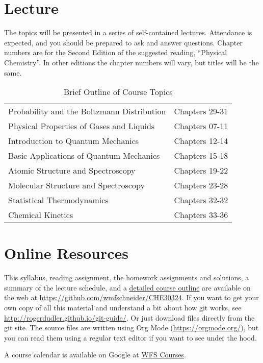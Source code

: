 \documentclass[11pt]{article}
\begin{document}
\section{Lecture}
\label{sec:org9fd3a7a}
The topics will be presented in a series of self-contained lectures. Attendance is expected, and you should be prepared to ask and answer questions. Chapter numbers are for the Second Edition of the suggested reading, ``Physical Chemistry''. In other editions the chapter numbers will vary, but titles will be the same. 

\begin{table}[htbp]
\caption{Brief Outline of Course Topics}
\centering
\begin{tabular}{ll}
\hline
Probability and the Boltzmann Distribution & Chapters 29-31\\
Physical Properties of Gases and Liquids & Chapters 07-11\\
Introduction to Quantum Mechanics & Chapters 12-14\\
Basic Applications of Quantum Mechanics & Chapters 15-18\\
Atomic Structure and Spectroscopy & Chapters 19-22\\
Molecular Structure and Spectroscopy & Chapters 23-28\\
Statistical Thermodynamics & Chapters 32-32\\
Chemical Kinetics & Chapters 33-36\\
\hline
\end{tabular}
\end{table}
\section{Online Resources}
\label{sec:org9281538}
This syllabus, reading assignment, the homework assignments and solutions, a summary of the lecture schedule, and a \href{https://github.com/wmfschneider/CHE30324/tree/master/Outline/CHE30324-outline.pdf}{detailed course outline} are available on the web at \url{https://github.com/wmfschneider/CHE30324}.  If you want to get your own copy of all this material and understand a bit about how git works, see \url{http://rogerdudler.github.io/git-guide/}.  Or just download files directly from the git site. The source files are written using Org Mode (\url{https://orgmode.org/}), but you can read them using a regular text editor if you want to see under the hood.

A course calendar is available on Google at \href{https://calendar.google.com/calendar/b/1?cid=NWJwN2pmMjI5bTdoYmFvM2R0cXM2NjYzOThAZ3JvdXAuY2FsZW5kYXIuZ29vZ2xlLmNvbQ}{WFS Courses}.
\end{document}
